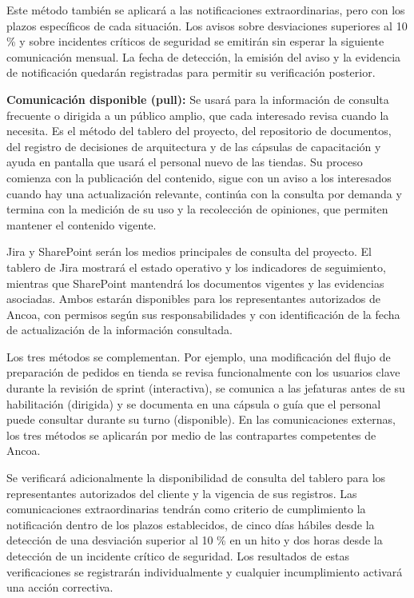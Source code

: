\documentclass[11pt]{article}
\begin{document}
Este método también se aplicará a las notificaciones extraordinarias,
pero con los plazos específicos de cada situación. Los avisos sobre
desviaciones superiores al 10 \% y sobre incidentes críticos de
seguridad se emitirán sin esperar la siguiente comunicación mensual. La
fecha de detección, la emisión del aviso y la evidencia de notificación
quedarán registradas para permitir su verificación posterior.

\textbf{Comunicación disponible (pull):} Se usará para la información de
consulta frecuente o dirigida a un público amplio, que cada interesado
revisa cuando la necesita. Es el método del tablero del proyecto, del
repositorio de documentos, del registro de decisiones de arquitectura y
de las cápsulas de capacitación y ayuda en pantalla que usará el
personal nuevo de las tiendas. Su proceso comienza con la publicación
del contenido, sigue con un aviso a los interesados cuando hay una
actualización relevante, continúa con la consulta por demanda y termina
con la medición de su uso y la recolección de opiniones, que permiten
mantener el contenido vigente.

Jira y SharePoint serán los medios principales de consulta del proyecto.
El tablero de Jira mostrará el estado operativo y los indicadores de
seguimiento, mientras que SharePoint mantendrá los documentos vigentes y
las evidencias asociadas. Ambos estarán disponibles para los
representantes autorizados de Ancoa, con permisos según sus
responsabilidades y con identificación de la fecha de actualización de
la información consultada.

Los tres métodos se complementan. Por ejemplo, una modificación del
flujo de preparación de pedidos en tienda se revisa funcionalmente con
los usuarios clave durante la revisión de sprint (interactiva), se
comunica a las jefaturas antes de su habilitación (dirigida) y se
documenta en una cápsula o guía que el personal puede consultar durante
su turno (disponible). En las comunicaciones externas, los tres métodos
se aplicarán por medio de las contrapartes competentes de Ancoa.

Se verificará adicionalmente la disponibilidad de consulta del tablero
para los representantes autorizados del cliente y la vigencia de sus
registros. Las comunicaciones extraordinarias tendrán como criterio de
cumplimiento la notificación dentro de los plazos establecidos, de cinco
días hábiles desde la detección de una desviación superior al 10 \% en
un hito y dos horas desde la detección de un incidente crítico de
seguridad. Los resultados de estas verificaciones se registrarán
individualmente y cualquier incumplimiento activará una acción
correctiva.
\end{document}
